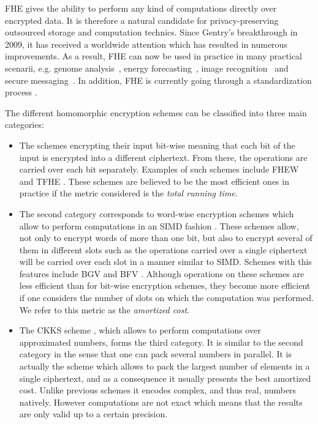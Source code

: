 \ac{FHE} gives the ability to perform any kind of computations directly over encrypted data. 
It is therefore a natural candidate for privacy-preserving outsourced storage and computation technics. 
Since Gentry's breakthrough in 2009, it has received a worldwide attention which has resulted in numerous improvements. 
As a result, \ac{FHE} can now be used in practice in many practical scenarii, e.g. genome analysis~\cite{KL15}, energy forecasting~\cite{BCIV17}, image recognition~\cite{BMMP18} and secure messaging~\cite{SP:ACLS18}. 
In addition, FHE is currently going through a standardization process \cite{HomomorphicEncryptionSecurityStandard}.

The different homomorphic encryption schemes can be classified into three main categories:

\begin{itemize}
\item The schemes encrypting their input bit-wise meaning that each bit of the input is encrypted into a different ciphertext. 
From there, the operations are carried over each bit separately. 
Examples of such schemes include FHEW \cite{DM15} and TFHE \cite{CGGI16}. 
These schemes are believed to be the most efficient ones in practice if the metric considered is the \emph{total running time}.
  
\item The second category corresponds to word-wise encryption schemes which allow to perform computations in an \ac{SIMD} fashion \cite{SV14}. These schemes allow, not only to encrypt words of more than one bit, but also to encrypt several of them in different slots such as the operations carried over a single ciphertext will be carried over each slot in a manner similar to \ac{SIMD}. Schemes with this features include BGV \cite{BGV12} and BFV \cite{FV12}. Although operations on these schemes are less efficient than for bit-wise encryption schemes, they become more efficient if one considers the number of slots on which the computation was performed. We refer to this metric as the \emph{amortized cost}.

\item The CKKS scheme \cite{CKKS17}, which allows to perform computations over approximated numbers, forms the third category. It is similar to the second category in the sense that one can pack several numbers in parallel. It is actually the scheme which allows to pack the largest number of elements in a single ciphertext, and as a consequence it usually presents the best amortized cost. Unlike previous schemes it encodes complex, and thus real, numbers natively. However computations are not exact which means that the results are only valid up to a certain precision. 
\end{itemize}

